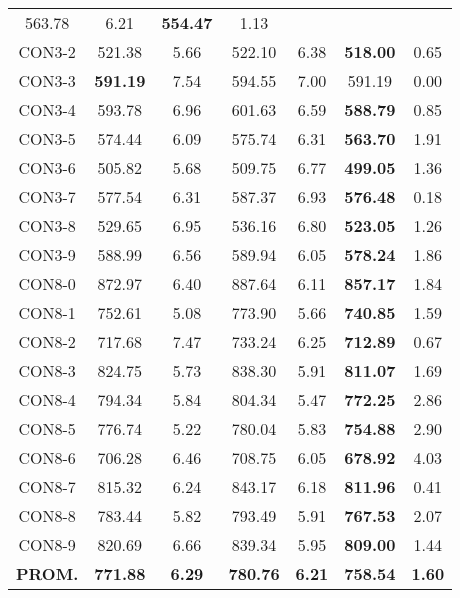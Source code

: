 \begin{table}[ht]
\begin{tabular}{c c c c c c c}
563.78 & 6.21 & \bf{554.47} & 
1.13\\CON3-2 & 521.38 & 5.66 & 
522.10 & 6.38 & \bf{518.00} & 
0.65\\CON3-3 & \bf{591.19} & 7.54 & 
594.55 & 7.00 & 591.19 & 0.00\\
CON3-4 & 593.78 & 6.96 & 
601.63 & 6.59 & \bf{588.79} & 
0.85\\CON3-5 & 574.44 & 6.09 & 
575.74 & 6.31 & \bf{563.70} & 
1.91\\CON3-6 & 505.82 & 5.68 & 
509.75 & 6.77 & \bf{499.05} & 
1.36\\CON3-7 & 577.54 & 6.31 & 
587.37 & 6.93 & \bf{576.48} & 
0.18\\CON3-8 & 529.65 & 6.95 & 
536.16 & 6.80 & \bf{523.05} & 
1.26\\CON3-9 & 588.99 & 6.56 & 
589.94 & 6.05 & \bf{578.24} & 
1.86\\CON8-0 & 872.97 & 6.40 & 
887.64 & 6.11 & \bf{857.17} & 
1.84\\CON8-1 & 752.61 & 5.08 & 
773.90 & 5.66 & \bf{740.85} & 
1.59\\CON8-2 & 717.68 & 7.47 & 
733.24 & 6.25 & \bf{712.89} & 
0.67\\CON8-3 & 824.75 & 5.73 & 
838.30 & 5.91 & \bf{811.07} & 
1.69\\CON8-4 & 794.34 & 5.84 & 
804.34 & 5.47 & \bf{772.25} & 
2.86\\CON8-5 & 776.74 & 5.22 & 
780.04 & 5.83 & \bf{754.88} & 
2.90\\CON8-6 & 706.28 & 6.46 & 
708.75 & 6.05 & \bf{678.92} & 
4.03\\CON8-7 & 815.32 & 6.24 & 
843.17 & 6.18 & \bf{811.96} & 
0.41\\CON8-8 & 783.44 & 5.82 & 
793.49 & 5.91 & \bf{767.53} & 
2.07\\CON8-9 & 820.69 & 6.66 & 
839.34 & 5.95 & \bf{809.00} & 
1.44\\\bf{PROM.} & 
\bf{771.88} & \bf{6.29} & \bf{780.76} & \bf{6.21} & \bf{758.54} & \bf{1.60}\\[1ex]\hline
\end{tabular}
\label{table:nonlin}
\end{table} \clearpage
